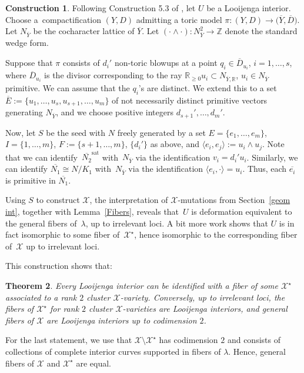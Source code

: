 \documentclass[pdftex]{sigma}
\numberwithin{equation}{section}
\numberwithin{figure}{section}
\numberwithin{table}{section}
\DeclareMathOperator{\sat}{sat}
\let\?=\overline
\let\bb=\mathbb
\let\rar=\rightarrow
\let\s=\mathcal
\newtheorem{thm}{Theorem}[section]
\theoremstyle{definition}
\newtheorem{constr}[thm]{Construction}
\begin{document}
\begin{constr}\label{LooijengaConstr}Following Construction 5.3 of \cite{GHK3}, let $U$ be a Looijenga interior. Choose a~compactification $(Y,D)$ admitting a toric model $\pi\colon (Y,D)\rar \big(\?{Y},\?{D}\big)$. Let $N_{\?{Y}}$ be the cocha\-rac\-ter lattice of $\?{Y}$. Let $(\cdot \wedge \cdot)\colon N_{\?{Y}}^2\rar \bb{Z}$ denote the standard wedge form.

Suppose that $\pi$ consists of $d_i'$ non-toric blowups at a point $q_i\in \?{D}_{u_i}$, $i=1,\dots,s$, where $\?{D}_{u_i}$ is the divisor corresponding to the ray $\bb{R}_{\geq 0} u_i \subset N_{\?{Y},\bb{R}}$, $u_i\in N_{\?{Y}}$ primitive.
 We can assume that the $q_i$'s are distinct. We extend this to a set $\?{E}:=\{u_1,\dots,u_s,u_{s+1},\dots,u_m\}$ of not necessarily distinct primitive vectors generating $N_{\?{Y}}$, and we choose positive integers $d_{s+1}',\dots,d_m'$.

Now, let $S$ be the seed with $N$ freely generated by a set $E=\{e_1,\dots,e_m\}$, $I=\{1,\dots,m\}$, $F:=\{s+1,\dots,m\}$, $\{d_i'\}$ as above, and $\langle e_i,e_j \rangle := u_i \wedge u_j$.
 Note that we can identify~$\?{N_2}^{\sat}$ with~$N_{\?{Y}}$ via the identification $v_i=d_i'u_i$. Similarly, we can identify $\?{N_1}\cong N/K_1$ with~$N_{\?{Y}}$ via the identification $\langle e_i,\cdot\rangle = u_i$. Thus, each $\?{e_i}$ is primitive in $\?{N_1}$.

 Using $S$ to construct $\s{X}$, the interpretation of $\s{X}$-mutations from Section~\ref{geom int}, together with Lemma~\ref{Fibers}, reveals that~$U$ is deformation equivalent to the general fibers of~$\lambda$, up to irrelevant loci. A bit more work shows that $U$ is in fact isomorphic to some fiber of~$\s{X}^{\star}$, hence isomorphic to the corresponding fiber of~$\s{X}$ up to irrelevant loci.
\end{constr}

This construction shows that:

\begin{thm}\label{Looijenga}Every Looijenga interior can be identified with a fiber of some $\s{X}^{\star}$ associated to a rank $2$ cluster $\s{X}$-variety. Conversely, up to irrelevant loci, the fibers of $\s{X}^{\star}$ for rank $2$ cluster $\s{X}$-varieties are Looijenga interiors, and general fibers of $\s{X}$ are Looijenga interiors up to codimension $2$.
 \end{thm}
For the last statement, we use that $\s{X}\setminus \s{X}^{\star}$ has codimension $2$ and consists of collections of complete interior curves supported in fibers of $\lambda$. Hence, general fibers of $\s{X}$ and $\s{X}^{\star}$ are equal.
\end{document}
